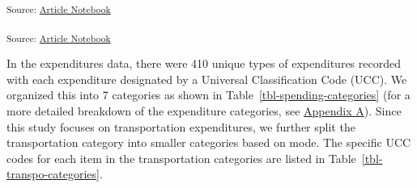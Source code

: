 \documentclass[
]{agujournal2019}
\begin{document}
\begin{table}

\caption{\label{tbl-ce-files}Diary Survey files available in the Public
Use Microdata (PUMD)}


\end{table}%

\textsubscript{Source:
\href{https://KamrynMansfield.github.io/transpo_budget_ces/index.qmd.html}{Article
Notebook}}

\textsubscript{Source:
\href{https://KamrynMansfield.github.io/transpo_budget_ces/index.qmd.html}{Article
Notebook}}

In the expenditures data, there were 410 unique types of expenditures
recorded with each expenditure designated by a Universal Classification
Code (UCC). We organized this into 7 categories as shown in
Table~\ref{tbl-spending-categories} (for a more detailed breakdown of
the expenditure categories, see \hyperref[sec-appendix-a]{Appendix A}).
Since this study focuses on transportation expenditures, we further
split the transportation category into smaller categories based on mode.
The specific UCC codes for each item in the transportation categories
are listed in Table~\ref{tbl-transpo-categories}.
\end{document}
